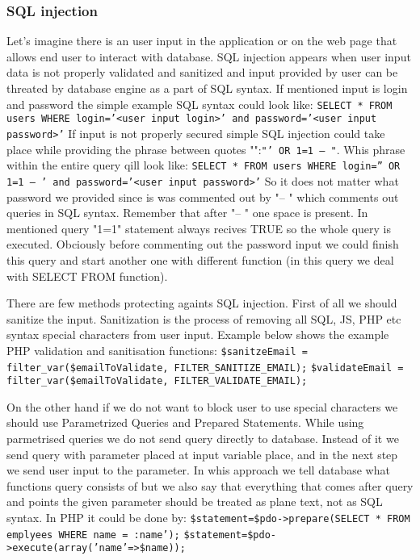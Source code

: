 \documentclass{article}[12pt]
\begin{document}
\subsubsection{SQL injection}
Let's imagine there is an user input in the application or on the web page that allows end user to interact with database.
SQL injection appears when
user input data is not properly validated and sanitized and input provided by user can be threated by database engine as a part of SQL syntax.
If mentioned input is login and password the simple example SQL syntax could look like:
\newline
\texttt{SELECT * FROM users WHERE login='<user input login>' and password='<user input password>'}
\newline
If input is not properly secured simple SQL injection could take place while providing the phrase between quotes "":\texttt{"' OR 1=1 -- "}.
Whis phrase within the entire query qill look like:
\newline
\texttt{SELECT * FROM users WHERE login='' OR 1=1 -- ' and password='<user input password>'}
So it does not matter what password we provided since is was commented out by "-- " which comments out queries in SQL syntax.
Remember that after "-- " one space is present.
In mentioned query "1=1" statement always recives TRUE so the whole query is executed.
Obciously before commenting out the password input we could finish this query and start another one with different function (in this query we deal with SELECT FROM function).

There are few methods protecting againts SQL injection.
First of all we should sanitize the input.
Sanitization is the process of removing all SQL, JS, PHP etc syntax special characters from user input.
Example below shows the example PHP validation and sanitisation functions:
\newline
\newline
\texttt{\$sanitzeEmail = filter\_var(\$emailToValidate, FILTER\_SANITIZE\_EMAIL);}
\newline
\texttt{\$validateEmail = filter\_var(\$emailToValidate, FILTER\_VALIDATE\_EMAIL);}
\newline

On the other hand if we do not want to block user to use special characters we should use Parametrized Queries and Prepared Statements.
While using parmetrised queries we do not send query directly to database.
Instead of it we send query with parameter placed at input variable place, and in the next step we send user input to the parameter.
In whis approach we tell database what functions query consists of but we also say that everything that comes after query and points the given parameter should be treated as plane text, not as SQL syntax.
In PHP it could be done by:
\newline
\newline
\texttt{\$statement=\$pdo->prepare(SELECT * FROM emplyees WHERE name = :name');}
\newline
\texttt{\$statement=\$pdo->execute(array('name'=>\$name));}
\newline
\end{document}
